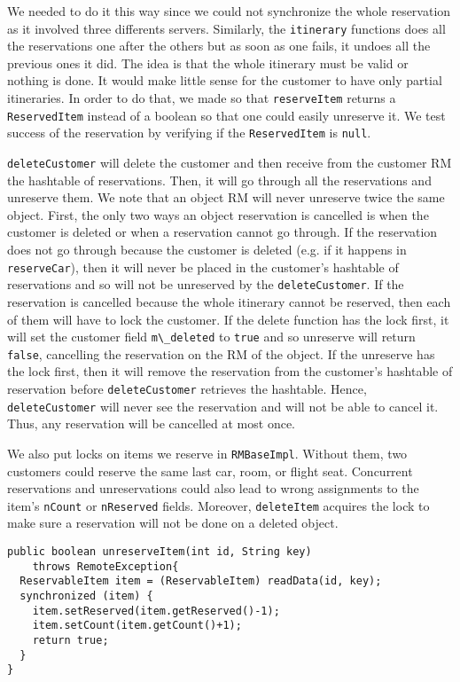 \documentclass[12pt]{article}
\theoremstyle{plain}%
\theoremstyle{definition}
\theoremstyle{remark}
\newcommand{\java}[1]{{\lstinline!#1!}}
\begin{document}
We needed to do it this way since we
could not synchronize the whole reservation as it involved three
differents servers. Similarly, the \java{itinerary} functions does all the
reservations one after the others but as soon as one fails, it undoes
all the previous ones it did. The idea is that the whole itinerary
must be valid or nothing is done. It would make little sense for the
customer to have only partial itineraries. In order to do that, we
made so that \java{reserveItem} returns a \java{ReservedItem} instead
of a boolean so that one could easily unreserve it. We test
success of the reservation by verifying if the \java{ReservedItem} is \java{null}.

 \java{deleteCustomer} will delete the
 customer and then receive from the customer RM the hashtable of
 reservations. Then, it will go through all the reservations and
 unreserve them. We note that an object RM will never unreserve twice
 the same object. First, the only two ways an object reservation is
 cancelled is when the customer is deleted or when a reservation cannot
 go through. If the reservation does not go through because the
 customer is deleted (e.g. if it happens in \java{reserveCar}), then it
 will never be placed in the customer's hashtable of reservations and
 so will not be unreserved by the \java{deleteCustomer}. If the
 reservation is cancelled because the whole itinerary cannot be
 reserved, then each of them will have to lock the customer. If the
 delete function has the lock first, it will set the customer field
 \java{m\_deleted} to \java{true} and so unreserve will return \java{false},
 cancelling the reservation on the RM of the object. If the unreserve
 has the lock first, then it will remove the reservation from the
 customer's hashtable of reservation before \java{deleteCustomer}
 retrieves the hashtable. Hence, \java{deleteCustomer} will never see
 the reservation and will not be able to cancel it. Thus, any
 reservation will be cancelled at most once.

We also put locks on items we reserve in \java{RMBaseImpl}. Without
them, two customers could reserve the same last car, room, or flight
seat. Concurrent reservations and unreservations could also lead to
wrong assignments to the item's \java{nCount} or \java{nReserved}
fields. Moreover, \java{deleteItem} acquires the lock to make sure a
reservation will not be done on a deleted object.

\begin{lstlisting}
public boolean unreserveItem(int id, String key)
    throws RemoteException{
  ReservableItem item = (ReservableItem) readData(id, key);
  synchronized (item) {
    item.setReserved(item.getReserved()-1);
    item.setCount(item.getCount()+1);
    return true;
  }
}
\end{lstlisting}
\end{document}
